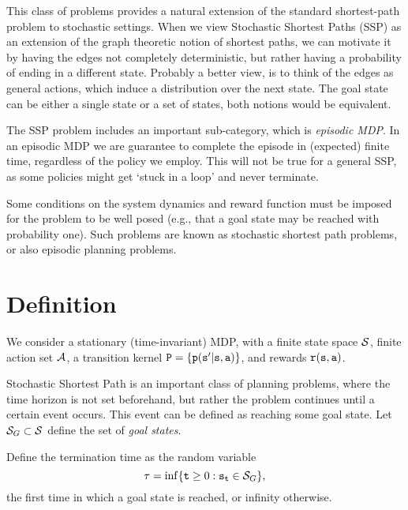 




This class of problems provides a natural extension of the standard shortest-path problem to stochastic settings. When we view Stochastic Shortest Paths (SSP) as an extension of the graph theoretic notion of shortest paths, we can motivate it by having the edges not completely deterministic, but rather having a probability of ending in a different state.
%
Probably a better view, is to think of the edges as general actions, which induce a distribution over the next state.
%
The goal state can be either a single state or a set of states, both notions would be equivalent. 

The SSP problem includes an important sub-category, which is {\em episodic MDP}. In an episodic MDP we are guarantee to complete the episode in (expected) finite time, regardless of the policy we employ. This will not be true for a general SSP, as some policies might get `stuck in a loop' and never terminate. 


Some conditions on the system dynamics and reward function must be imposed for the problem to be well posed (e.g., that a goal state may be reached  with probability one).
Such problems are known as stochastic shortest path problems, or also episodic planning problems. 

\section{Definition}

We consider a stationary (time-invariant) MDP, with a finite state
space $\mathcal{S}$, finite action set $\mathcal{A}$, a transition kernel
${\tt P} = \{{\tt p}({\tt s}'|{\tt s},{\tt a})\}$, and rewards ${\tt r}({\tt s},{\tt a})$.

Stochastic Shortest Path is an important class of planning problems, 
where the time horizon is not
set beforehand, but rather the problem continues until a certain
event occurs. This event can be defined as reaching some goal state.
Let  ${\mathcal{S}_G} \subset \mathcal{S}$ define the set of \emph{goal
states}. 

\begin{definition}
Define the termination time as the random variable
\[\tau  = \inf \{ {\tt t} \ge 0:{{\tt s}_{\tt t}} \in {\mathcal{S}_G}\}, \]
the first time in which a goal state is reached, or infinity otherwise.    
\end{definition}

